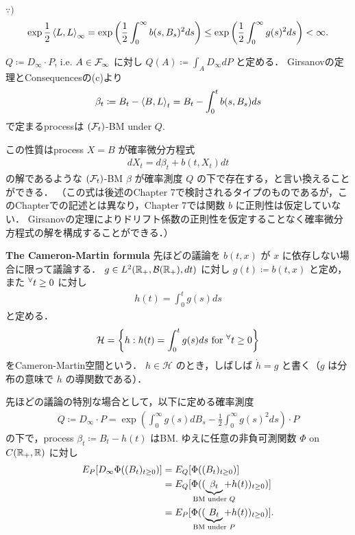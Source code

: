 \documentclass{jsarticle}
\begin{document}
\begin{screen}
    $\because)$
    \begin{align}
        \exp\frac{1}{2}\left\langle L,L\right\rangle_\infty
        = \exp\left(\frac{1}{2}\int_0^\infty b(s,B_s)^2 ds\right)
        \le \exp\left(\frac{1}{2}\int_0^\infty g(s)^2 ds\right)
        < \infty.
    \end{align}
\end{screen}

$Q\coloneqq D_\infty\cdot P$, i.e. $A\in\mathcal{F}_\infty$ に対し $Q(A)\coloneqq\int_A D_\infty dP$ と定める．
Girsanovの定理とConsequencesの(c)より
\begin{align}
    \beta_t
    \coloneqq B_t-\left\langle B,L\right\rangle_t
    = B_t-\int_0^t b(s,B_s)ds
\end{align}
で定まるprocessは $(\mathcal{F}_t)$-BM under $Q.$

この性質はprocess $X=B$ が確率微分方程式
\begin{align}
    dX_t=d\beta_t+b(t,X_t)dt
\end{align}
の解であるような $(\mathcal{F}_t)$-BM $\beta$ が確率測度 $Q$ の下で存在する，と言い換えることができる．
（この式は後述のChapter 7で検討されるタイプのものであるが，このChapterでの記述とは異なり，Chapter 7では関数 $b$ に正則性は仮定していない．
Girsanovの定理によりドリフト係数の正則性を仮定することなく確率微分方程式の解を構成することができる．）

\textbf{The Cameron-Martin formula}
先ほどの議論を $b(t,x)$ が $x$ に依存しない場合に限って議論する．
$g\in L^2(\mathbb{R}_+,\mathcal{B}(\mathbb{R}_+),dt)$ に対し $g(t)\coloneqq b(t,x)$ と定め，また ${}^{\forall} t\ge0$ に対し
\begin{align}
    h(t)=\int_{0}^{t}g(s)ds
\end{align}
と定める．
\begin{align}
    \mathcal{H}
    = \left\{h:h(t)=\int_{0}^{t}g(s)ds\text{ for }{}^{\forall} t\ge0\right\}
\end{align}
をCameron-Martin空間という．
$h\in\mathcal{H}$ のとき，しばしば $\dot{h}=g$ と書く（$g$ は分布の意味で $h$ の導関数である）．

先ほどの議論の特別な場合として，以下に定める確率測度
\begin{align}
    Q
    \coloneqq D_\infty\cdot P
    = \exp\left(\int_0^\infty g(s)dB_s-\frac{1}{2}\int_0^\infty g(s)^2 ds\right)\cdot P
\end{align}
の下で，process $\beta_t\coloneqq B_t-h(t)$ はBM.
ゆえに任意の非負可測関数 $\Phi$ on $C(\mathbb{R}_+,\mathbb{R})$ に対し
\begin{align}
    E_P[D_\infty\Phi((B_t)_{t\ge0})]
    &= E_Q[\Phi((B_t)_{t\ge0})] \\
    &= E_Q[\Phi((\UB{\beta_t}{\text{BM under }Q}+h(t))_{t\ge0})] \\
    &= E_P[\Phi((\UB{B_t}{\text{BM under }P}+h(t))_{t\ge0})].
\end{align}
\end{document}
